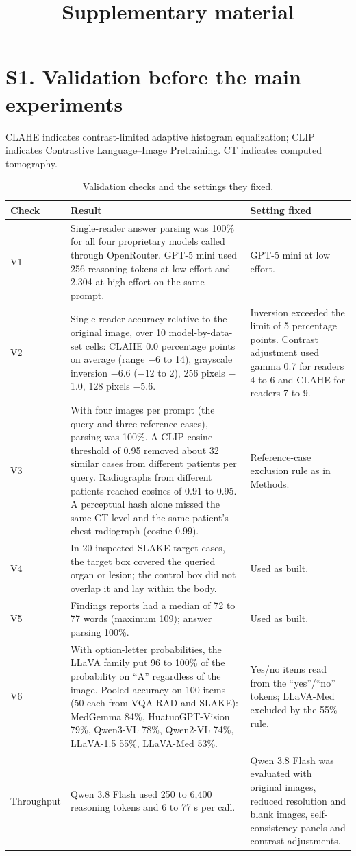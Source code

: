 \documentclass[preprint,12pt]{elsarticle}
\begin{document}
\begin{frontmatter}
\title{Supplementary material}
\end{frontmatter}

\section*{S1. Validation before the main experiments}
CLAHE indicates contrast-limited adaptive histogram equalization; CLIP indicates Contrastive Language--Image Pretraining. CT indicates computed tomography.

\begin{table}[!htbp]
\centering
\caption{Validation checks and the settings they fixed.}
\label{tab:validation}
\footnotesize
\begin{tabular}{p{}p{}p{}}
\toprule
Check & Result & Setting fixed \\
\midrule
V1 & Single-reader answer parsing was 100\% for all four proprietary models called through OpenRouter. GPT-5 mini used 256 reasoning tokens at low effort and 2,304 at high effort on the same prompt. & GPT-5 mini at low effort. \\
V2 & Single-reader accuracy relative to the original image, over 10 model-by-data-set cells: CLAHE 0.0 percentage points on average (range $-$6 to 14), grayscale inversion $-$6.6 ($-$12 to 2), 256 pixels $-$1.0, 128 pixels $-$5.6. & Inversion exceeded the limit of 5 percentage points. Contrast adjustment used gamma 0.7 for readers 4 to 6 and CLAHE for readers 7 to 9. \\
V3 & With four images per prompt (the query and three reference cases), parsing was 100\%. A CLIP cosine threshold of 0.95 removed about 32 similar cases from different patients per query. Radiographs from different patients reached cosines of 0.91 to 0.95. A perceptual hash alone missed the same CT level and the same patient's chest radiograph (cosine 0.99). & Reference-case exclusion rule as in Methods. \\
V4 & In 20 inspected SLAKE-target cases, the target box covered the queried organ or lesion; the control box did not overlap it and lay within the body. & Used as built. \\
V5 & Findings reports had a median of 72 to 77 words (maximum 109); answer parsing 100\%. & Used as built. \\
V6 & With option-letter probabilities, the LLaVA family put 96 to 100\% of the probability on ``A'' regardless of the image. Pooled accuracy on 100 items (50 each from VQA-RAD and SLAKE): MedGemma 84\%, HuatuoGPT-Vision 79\%, Qwen3-VL 78\%, Qwen2-VL 74\%, LLaVA-1.5 55\%, LLaVA-Med 53\%. & Yes/no items read from the ``yes''/``no'' tokens; LLaVA-Med excluded by the 55\% rule. \\
Throughput & Qwen 3.8 Flash used 250 to 6,400 reasoning tokens and 6 to 77 s per call. & Qwen 3.8 Flash was evaluated with original images, reduced resolution and blank images, self-consistency panels and contrast adjustments. \\
\bottomrule
\end{tabular}
\end{table}
\end{document}
